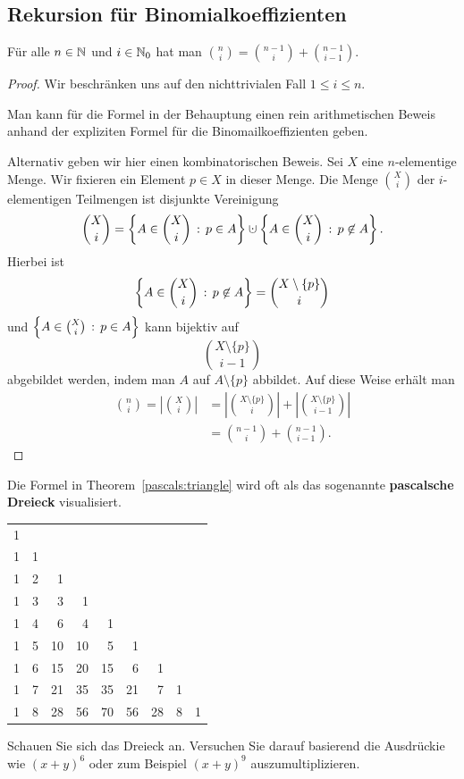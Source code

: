 \subsection{Rekursion für Binomialkoeffizienten} 

\begin{thm} \label{pascals:triangle} 
	Für alle $n \in \mathbb{N}$ und $i \in \mathbb{N}_0$ hat man $\binom{n}{i}  = \binom{n-1}{i}  + \binom{n-1}{i-1}$. 
\end{thm} 
\begin{proof} 
	Wir beschränken uns auf den nichttrivialen Fall $1 \le i \le n$. 
	
	Man kann für die Formel in der Behauptung einen rein arithmetischen Beweis anhand der expliziten Formel für die Binomailkoeffizienten geben. 
	
	Alternativ geben wir hier einen kombinatorischen Beweis. Sei $X$ eine $n$-elementige Menge. Wir fixieren ein Element $p\in X$ in dieser Menge. Die Menge $\binom{X}{i}$ der $i$-elementigen Teilmengen ist disjunkte Vereinigung 
	\[
		\binom{X}{i} = \setcond{ A \in \binom{X}{i}}{p \in A} \cupdot \setcond{A \in \binom{X}{i}}{p \not\in A}. 
	\]
	Hierbei ist 
	\[
			\left\{ A \in \binom{X}{i} \,:\, p \not\in A \right\} = \binom{X \setminus \{p\}}{i}
	\]
	und $\left\{  A \in \binom{X}{i} \,:\, p \in A \right\}$ kann bijektiv auf 
	\[
			\binom{X \setminus \{p\}}{i-1}
	\]
	abgebildet werden, indem man $A$ auf $A \setminus \{p\}$ abbildet. Auf diese Weise erhält man 
	\begin{align*}
		\binom{n}{i} = \left| \binom{X}{i} \right| & = \left| \binom{X \setminus \{p\}}{i} \right| + \left| \binom{X \setminus \{p\}}{i-1}\right| 
		\\ & = \binom{n-1}{i} + \binom{n-1}{i-1}. 
	\end{align*} 
\end{proof} 


\begin{aufg}
	Die Formel in Theorem~\ref{pascals:triangle} wird oft als das sogenannte \textbf{pascalsche Dreieck} visualisiert. 
	\begin{center}
	\begin{tabular}{rrrrrrrrr}
1\\
1 & 1\\
1 & 2 & 1\\
1 & 3 & 3 & 1\\
1 & 4 & 6 & 4 & 1\\
1 & 5 & 10 & 10 & 5 & 1\\
1 & 6 & 15 & 20 & 15 & 6 & 1\\
1 & 7 & 21 & 35 & 35 & 21 & 7 & 1\\
1 & 8 & 28 & 56 & 70 & 56 & 28 & 8 & 1
	\end{tabular}
\end{center}
Schauen Sie sich das Dreieck an. Versuchen Sie darauf basierend die Ausdrückie wie $(x+y)^6$ oder zum Beispiel $(x+y)^9$ auszumultiplizieren. 
\end{aufg} 

